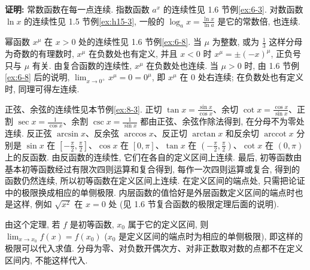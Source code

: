 \documentclass[UTF8,openany]{ctexbook}
\theoremstyle{chinesetextbook}
\newenvironment{cnproof}{\par\indent\textbf{证明:} \ignorespaces}{\par}
\begin{document}
\begin{cnproof}
常数函数在每一点连续. 指数函数 $a^x$ 的连续性见 1.6 节例\ref{ex:6-3}. 对数函数 $\ln x$ 的连续性见 1.5 节例\ref{ex:h15-3}, 一般的 $\displaystyle\log_ax=\frac{\ln x}{\ln a}$ 是它的常数倍, 也连续.

幂函数 $x^\mu$ 在 $x>0$ 处的连续性见 1.6 节例\ref{ex:6-8}. 当 $\mu$ 为整数, 或为 $\displaystyle\frac13$ 这样分母为奇数的有理数时, $x^\mu$ 在负数处也有定义, 并且 $x<0$ 时 $x^\mu=\pm(-x)^\mu$, 正负号只与 $\mu$ 有关. 由复合函数的连续性, $x^\mu$ 在负数处也连续. 当 $\mu>0$ 时, 由 1.6 节例\ref{ex:6-8} 后的说明, $\displaystyle\lim_{x\to0^+}x^\mu=0=0^\mu$, 即 $x^\mu$ 在 $0$ 处右连续; 在负数处也有定义时, 同理可得左连续.

正弦、余弦的连续性见本节例\ref{ex:8-3}. 正切 $\displaystyle\tan x=\frac{\sin x}{\cos x}$、余切 $\displaystyle\cot x=\frac{\cos x}{\sin x}$、正割 $\displaystyle\sec x=\frac1{\cos x}$、余割 $\displaystyle\csc x=\frac1{\sin x}$ 都由正弦、余弦作除法得到, 在分母不为零处连续. 反正弦 $\arcsin x$、反余弦 $\arccos x$、反正切 $\arctan x$ 和反余切 $\operatorname{arccot}x$ 分别是 $\sin x$ 在 $\displaystyle\left[-\frac\pi2,\frac\pi2\right]$、$\cos x$ 在 $[0,\pi]$、$\tan x$ 在 $\displaystyle\left(-\frac\pi2,\frac\pi2\right)$、$\cot x$ 在 $(0,\pi)$ 上的反函数. 由反函数的连续性, 它们在各自的定义区间上连续. 最后, 初等函数由基本初等函数经过有限次四则运算和复合得到, 每作一次四则运算或复合, 得到的函数仍然连续, 所以初等函数在定义区间上连续. 在定义区间的端点处, 只需把论证中的极限换成相应的单侧极限. 内层函数的值恰好是外层函数定义区间的端点时也是这样, 例如 $\sqrt{x^2}$ 在 $x=0$ 处 (见 1.6 节复合函数的极限定理后面的说明).
\end{cnproof}
由这个定理, 若 $f$ 是初等函数, $x_0$ 属于它的定义区间, 则 $\displaystyle\lim_{x\to x_0}f(x)=f(x_0)$ ($x_0$ 是定义区间的端点时为相应的单侧极限), 即这样的极限可以代入求值. 分母为零、对负数开偶次方、对非正数取对数的点都不在定义区间内, 不能这样代入.
\end{document}
